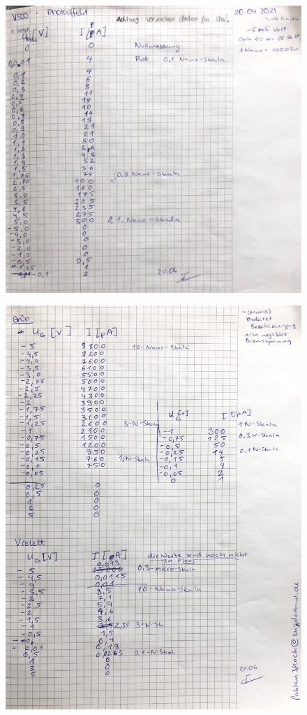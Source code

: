 \begin{figure}
    \centering
    \includegraphics[width=\textwidth]{content/photorot.pdf}
\end{figure}
\begin{figure}
    \centering
    \includegraphics[width=\textwidth]{content/photogrunvio.pdf}
\end{figure}
